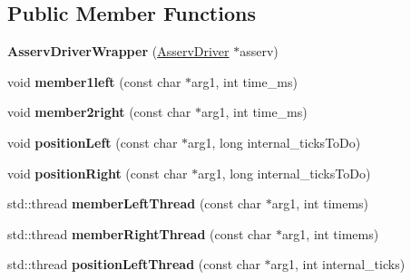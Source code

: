 \subsection*{Public Member Functions}
\begin{DoxyCompactItemize}
\item 
\mbox{\label{classAsservDriverWrapper_ac9cdc2a725579a0e67e3e5d70fea98ff}} 
{\bfseries Asserv\+Driver\+Wrapper} (\hyperlink{classAsservDriver}{Asserv\+Driver} $\ast$asserv)
\item 
\mbox{\label{classAsservDriverWrapper_a4d3b337fd6beed104ba60b69213344cc}} 
void {\bfseries member1left} (const char $\ast$arg1, int time\+\_\+ms)
\item 
\mbox{\label{classAsservDriverWrapper_af356c1725a4b8dac9994dd0d94e12069}} 
void {\bfseries member2right} (const char $\ast$arg1, int time\+\_\+ms)
\item 
\mbox{\label{classAsservDriverWrapper_aad45be064ecfd5eed9c687875f0e92e5}} 
void {\bfseries position\+Left} (const char $\ast$arg1, long internal\+\_\+ticks\+To\+Do)
\item 
\mbox{\label{classAsservDriverWrapper_a4642069f82e26bf54045931a819a4d84}} 
void {\bfseries position\+Right} (const char $\ast$arg1, long internal\+\_\+ticks\+To\+Do)
\item 
\mbox{\label{classAsservDriverWrapper_a6d2ba86845397e2a65e62660f7d94710}} 
std\+::thread {\bfseries member\+Left\+Thread} (const char $\ast$arg1, int timems)
\item 
\mbox{\label{classAsservDriverWrapper_af629788681c4e3155c9fc56d6a783d8a}} 
std\+::thread {\bfseries member\+Right\+Thread} (const char $\ast$arg1, int timems)
\item 
\mbox{\label{classAsservDriverWrapper_a8c951da2eafa9448971f7f68088edec8}} 
std\+::thread {\bfseries position\+Left\+Thread} (const char $\ast$arg1, int internal\+\_\+ticks)
\item 
\mbox{\label{classAsservDriverWrapper_a0851aa582a82bf4cf9de2dcf240d585e}} 

\end{DoxyCompactItemize}
